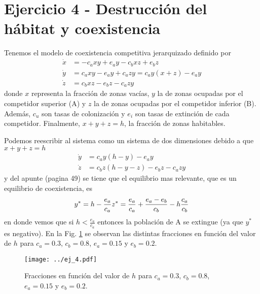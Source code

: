 \section*{Ejercicio 4 - Destrucción del hábitat y coexistencia}

Tenemos el modelo de coexistencia competitiva jerarquizado definido por
\begin{align}
    \dot{x} &= -c_{a}xy + e_{a}y - c_{b}xz + e_{b}z \\[6pt]
    \dot{y} &=  c_{a}xy - e_{a}y + c_{a}zy = c_{a} y \left(x+z\right) - e_a y          \\[6pt]
    \dot{z} &=  c_{b}xz - e_{b}z - c_{a}zy
\end{align}
donde $x$ representa la fracción de zonas vacías, $y$ la de zonas ocupadas por el competidor superior (A) y $z$ la de zonas
ocupadas por el competidor inferior (B). Además, $c_u$ son tasas de colonización y $e_i$ son tasas de extinción de cada
competidor. Finalmente, $x + y + z = h$, la fracción de zonas habitables.

Podemos reescribir al sistema como un sistema de dos dimensiones debido a que  $x + y + z = h$
\begin{align}
    \dot{y} &= c_{a} y \left(h-y\right) - e_a y          \\[6pt]
    \dot{z} &=  c_{b}z \left(h-y-z\right) - e_{b}z - c_{a}zy
\end{align}
y del apunte \cite{Chule} (pagina 49) se tiene que el equilibrio mas relevante, que es un equilibrio de coexistencia, es
\begin{equation}
    y^* = h - \frac{e_a}{c_a} \\
    z^* = \frac{e_a}{c_a} + \frac{e_a - e_b}{c_b} - h \frac{c_a}{c_b}
\end{equation}
en donde vemos que si $h < \frac{e_a}{c_a}$ entonces la población de A se extingue (ya que $y^*$ es negativo). En la Fig. \ref{fig:ej4} se observan las distintas fracciones en función del valor de $h$ para $c_a=0.3$, $c_b=0.8$, $e_a=0.15$ y $e_b = 0.2$.

\begin{figure}
    \centering
    \texttt{[image: ../ej\_4.pdf]}
    \caption{Fracciones en función del valor de $h$ para $c_a=0.3$, $c_b=0.8$, $e_a=0.15$ y $e_b = 0.2$.}
    \label{fig:ej4}
\end{figure}
